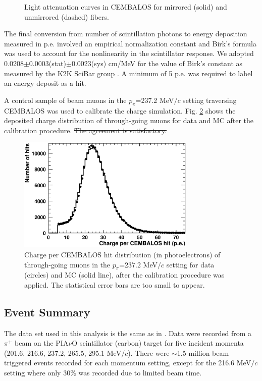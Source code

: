\begin{enumerate}
\begin{figure}[!h]
\begin{center}
\caption{Light attenuation curves in CEMBALOS for mirrored (solid) and unmirrored (dashed) fibers.}
\label{fig:attcurves}
\end{center} 
\end{figure}

{\color{red}\item{The final conversion from number of scintillation photons to energy deposition measured in p.e. involved  an empirical normalization constant and Birk's formula was used to account for the nonlinearity in the scintillator response. We adopted 0.0208$\pm$0.0003(stat)$\pm$0.0023(sys) cm/MeV for the value of Birk's constant as measured by the K2K SciBar group \cite{scibar}. A minimum of 5 p.e. was required to label an energy deposit as a hit.}}
\end{enumerate}

A control sample of beam muons in the $p_{\pi}$=237.2 MeV$/c$ setting traversing CEMBALOS was used to calibrate the charge simulation. Fig. \ref{fig:muoncharge} shows the deposited charge distribution of through-going muons for data and MC after the calibration procedure. \st{The agreement is satisfactory.}

\begin{figure}[!h]
\begin{center}
\includegraphics[width=85mm]{figures/muon_charge_calib.eps}
\caption{Charge per CEMBALOS hit distribution (in photoelectrons) of through-going muons in the $p_{\pi}$=237.2 MeV$/c$ setting for data (circles) and MC (solid line), after the calibration procedure was applied. The statistical error bars are too small to appear.}
\label{fig:muoncharge}
\end{center}
\end{figure}

\subsection{Event Summary}
The data set used in this analysis is the same as in \cite{duet}. Data were recorded from a $\pi^{+}$ beam on the PIA$\nu$O scintillator (carbon) target for five incident momenta (201.6, 216.6, 237.2, 265.5, 295.1 MeV$/c$). There were $\sim$1.5 million beam triggered events recorded for each momentum setting, except for the 216.6 MeV$/c$ setting where only 30\% was recorded due to limited beam time.
